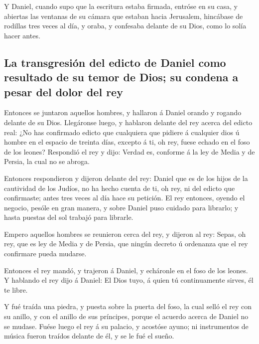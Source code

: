  Y Daniel, cuando supo que la escritura estaba firmada,
entróse en su casa, y abiertas las ventanas de su cámara que estaban
hacia Jerusalem, hincábase de rodillas tres veces al día, y oraba, y
confesaba delante de su Dios, como lo solía hacer antes.

\hypertarget{la-transgresiuxf3n-del-edicto-de-daniel-como-resultado-de-su-temor-de-dios-su-condena-a-pesar-del-dolor-del-rey}{%
\subsection{La transgresión del edicto de Daniel como resultado de su
temor de Dios; su condena a pesar del dolor del
rey}\label{la-transgresiuxf3n-del-edicto-de-daniel-como-resultado-de-su-temor-de-dios-su-condena-a-pesar-del-dolor-del-rey}}

 Entonces se juntaron aquellos hombres, y hallaron á Daniel
orando y rogando delante de su Dios.  Llegáronse luego, y
hablaron delante del rey acerca del edicto real: ¿No has confirmado
edicto que cualquiera que pidiere á cualquier dios ú hombre en el
espacio de treinta días, excepto á ti, oh rey, fuese echado en el foso
de los leones? Respondió el rey y dijo: Verdad es, conforme á la ley de
Media y de Persia, la cual no se abroga.

 Entonces respondieron y dijeron delante del rey: Daniel
que es de los hijos de la cautividad de los Judíos, no ha hecho cuenta
de ti, oh rey, ni del edicto que confirmaste; antes tres veces al día
hace su petición.  El rey entonces, oyendo el negocio,
pesóle en gran manera, y sobre Daniel puso cuidado para librarlo; y
hasta puestas del sol trabajó para librarle.

 Empero aquellos hombres se reunieron cerca del rey, y
dijeron al rey: Sepas, oh rey, que es ley de Media y de Persia, que
ningún decreto ú ordenanza que el rey confirmare pueda mudarse.

 Entonces el rey mandó, y trajeron á Daniel, y echáronle en
el foso de los leones. Y hablando el rey dijo á Daniel: El Dios tuyo, á
quien tú continuamente sirves, él te libre.

 Y fué traída una piedra, y puesta sobre la puerta del
foso, la cual selló el rey con su anillo, y con el anillo de sus
príncipes, porque el acuerdo acerca de Daniel no se mudase.
 Fuése luego el rey á su palacio, y acostóse ayuno; ni
instrumentos de música fueron traídos delante de él, y se le fué el
sueño.

